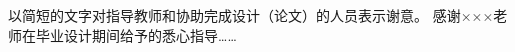 \begin{acknowledgements}
以简短的文字对指导教师和协助完成设计（论文）的人员表示谢意。
感谢×××老师在毕业设计期间给予的悉心指导……
\end{acknowledgements}
